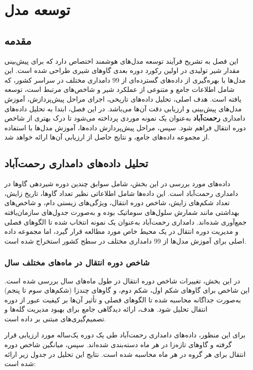 \chapter{توسعه مدل}
\section{مقدمه}

این فصل به تشریح فرآیند توسعه مدل‌های هوشمند اختصاص دارد که برای پیش‌بینی مقدار شیر تولیدی در اولین رکورد دوره بعدی گاوهای شیری طراحی شده است. این مدل‌ها با بهره‌گیری از داده‌های گسترده‌ای از \num{99} دامداری مختلف در سراسر کشور، که شامل اطلاعات جامع و متنوعی از عملکرد شیر و شاخص‌های مرتبط است، توسعه یافته است. هدف اصلی، تحلیل داده‌های تاریخی، اجرای مراحل پیش‌پردازش، آموزش مدل‌های پیش‌بینی و ارزیابی دقت آن‌ها می‌باشد. در این فصل، ابتدا به تحلیل داده‌های دامداری \textbf{رحمت‌آباد} به‌عنوان یک نمونه موردی پرداخته می‌شود تا درک بهتری از شاخص دوره انتقال فراهم شود. سپس، مراحل پیش‌پردازش داده‌ها، آموزش مدل‌ها با استفاده از مجموعه داده‌های جامع، و نتایج حاصل از ارزیابی آن‌ها ارائه خواهد شد.

\section{تحلیل داده‌های دامداری رحمت‌آباد}

داده‌های مورد بررسی در این بخش، شامل سوابق چندین دوره شیردهی گاوها در دامداری رحمت‌آباد است. این داده‌ها شامل اطلاعاتی نظیر تعداد گاوها، تاریخ زایش، تعداد شکم‌های زایش، شاخص دوره انتقال، ویژگی‌های زیستی دام، و شاخص‌های بهداشتی مانند شمارش سلول‌های سوماتیک بوده و به‌صورت جدول‌های سازمان‌یافته جمع‌آوری شده‌اند. دامداری رحمت‌آباد به‌عنوان یک نمونه انتخاب شده تا الگوهای فصلی و مدیریت دوره انتقال در یک محیط خاص مورد مطالعه قرار گیرد، اما مجموعه داده اصلی برای آموزش مدل‌ها از \num{99} دامداری مختلف در سطح کشور استخراج شده است.

\subsection{شاخص دوره انتقال در ماه‌های مختلف سال}

در این بخش، تغییرات شاخص دوره انتقال در طول ماه‌های سال بررسی شده است. این شاخص برای گاوهای شکم اول، شکم دوم، و گاوهای چندزا (شکم‌های سوم تا پنجم) به‌صورت جداگانه محاسبه شده تا الگوهای فصلی و تأثیر آن‌ها بر کیفیت عبور از دوره انتقال تحلیل شود. هدف، ارائه دیدگاهی جامع برای بهبود مدیریت گله‌ها و تصمیم‌گیری‌های مبتنی بر داده است.

برای این منظور، داده‌های دامداری رحمت‌آباد طی یک دوره یک‌ساله مورد ارزیابی قرار گرفته و گاوهای تازه‌زا در هر ماه دسته‌بندی شده‌اند. سپس، میانگین شاخص دوره انتقال برای هر گروه در هر ماه محاسبه شده است. نتایج این تحلیل در جدول زیر ارائه شده است:


